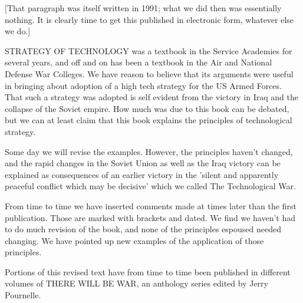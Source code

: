 [That paragraph was itself written in 1991; what we did then was essentially nothing. It is clearly time to get this published in electronic form, whatever else we do.]

STRATEGY OF TECHNOLOGY was a textbook in the Service Academies for several years, and off and on has been a textbook in the Air and National Defense War Colleges. We have reason to believe that its arguments were useful in bringing about adoption of a high tech strategy for the US Armed Forces. That such a strategy was adopted is self evident from the victory in Iraq and the collapse of the Soviet empire. How much was due to this book can be debated, but we can at least claim that this book explains the principles of technological strategy.

Some day we will revise the examples. However, the principles haven't changed, and the rapid changes in the Soviet Union as well as the Iraq victory can be explained as consequences of an earlier victory in the 'silent and apparently peaceful conflict which may be decisive' which we called The Technological War.

From time to time we have inserted comments made at times later than the first publication. Those are marked with brackets and dated. We find we haven't had to do much revision of the book, and none of the principles espoused needed changing. We have pointed up new examples of the application of those principles.

Portions of this revised text have from time to time been published in different volumes of THERE WILL BE WAR, an anthology series edited by Jerry Pournelle.
